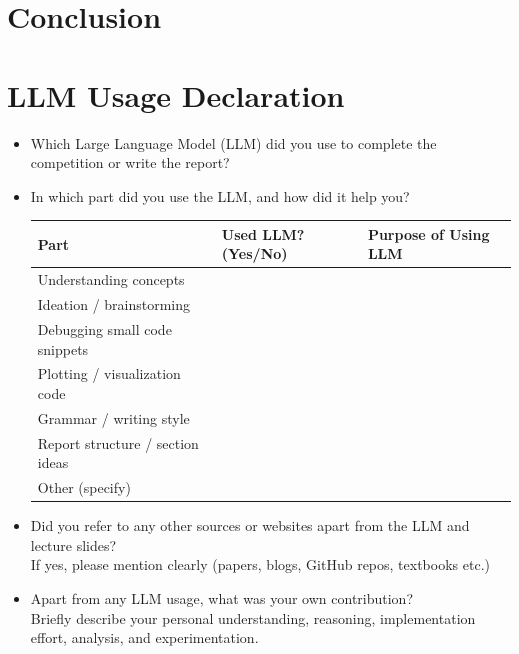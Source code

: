 \documentclass[11pt, oneside]{article}   	%
\begin{document}
\section{Conclusion}

\vspace{3cm}

\section*{LLM Usage Declaration}
\begin{itemize}
\item Which Large Language Model (LLM) did you use to complete the competition or write the report? \\

\item In which part did you use the LLM, and how did it help you?

\begin{tabular}{l|l|l}
\toprule
Part & Used LLM? (Yes/No) & Purpose of Using LLM \\
\midrule
Understanding concepts &  &   \\
Ideation / brainstorming &  &   \\
Debugging small code snippets &  &   \\
Plotting / visualization code &  &   \\
Grammar / writing style &  &   \\
Report structure / section ideas &  &  \\
Other (specify) &  &   \\
\bottomrule
\end{tabular}

\item Did you refer to any other sources or websites apart from the LLM and lecture slides? \\
If yes, please mention clearly (papers, blogs, GitHub repos, textbooks etc.)

\item Apart from any LLM usage, what was your own contribution? \\
Briefly describe your personal understanding, reasoning, implementation effort, analysis, and experimentation.
\end{itemize}

% 
% 
\end{document}
